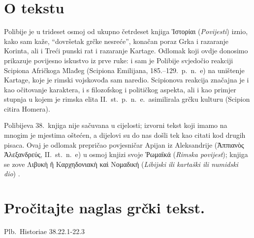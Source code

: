 

\section*{O tekstu}

Polibije je u trideset osmoj od ukupno četrdeset knjiga \textgreek[variant=ancient]{Ἱστορίαι} (\textit{Povijesti}) iznio, kako sam kaže, ``dovršetak grčke nesreće'', konačan poraz Grka i razaranje Korinta, ali i Treći punski rat i razaranje Kartage. Odlomak koji ovdje donosimo prikazuje povijesno iskustvo iz prve ruke: i sam je Polibije svjedočio reakciji Scipiona Afričkoga Mlađeg (Scipiona Emilijana, 185.–129.\ p.~n.~e) na uništenje Kartage, koje je rimski vojskovođa sam naredio. Scipionova reakcija značajna je i kao očitovanje karaktera, i s filozofskog i političkog aspekta, ali i kao primjer stupnja u kojem je rimska elita II.~st.\ p.~n.~e.\ asimilirala grčku kulturu (Scipion citira Homera).

Polibijeva 38.\ knjiga nije sačuvana u cijelosti; izvorni tekst koji imamo na mnogim je mjestima oštećen, a dijelovi su do nas došli tek kao citati kod drugih pisaca. Ovaj je odlomak prepričao povjesničar Apijan iz Aleksandrije \textgreek[variant=ancient]{(Ἀππιανὸς Ἀλεξανδρεύς,} II.~st.\ n.~e) u osmoj knjizi svoje \textgreek[variant=ancient]{Ῥωμαϊκά} (\textit{Rimska povijest}); knjiga se zove \textgreek[variant=ancient]{Λιβυκὴ ἢ Καρχηδονιακὴ καὶ Νομαδική} (\textit{Libijski ili kartaški ili numidski dio}) .


\section*{Pročitajte naglas grčki tekst.}

Plb.\ Historiae 38.22.1-22.3


\medskip


